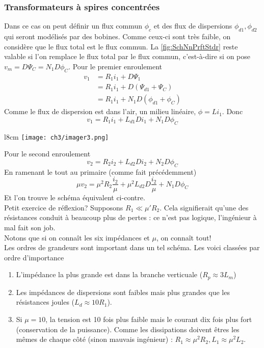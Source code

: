 		\subsubsection{Transformateurs à spires concentrées}
		Dans ce cas on peut définir un flux commun $\phi_c$ et des flux de 
		dispersions $\phi_{d1},\phi_{d2}$ qui seront modélisés par des bobines. 
		Comme ceux-ci sont très faible, on 
		considère que le flux total est le flux commun. La \autoref{fig:SchNnPrftStdr}
		reste valable si l'on remplace le flux total par le flux commun, c'est-à-dire 
		si on pose $v_m = D\Psi_C=N_1D\phi_C$.
		Pour le premier enroulement
		\begin{equation}
		\begin{array}{ll}
		v_1 &= R_1i_1 + D\Psi_1\\
		&= R_1i_1 + D(\Psi_{d1}+\Psi_C)\\
		&= R_1i_1 + N_1D(\phi_{d1}+\phi_C)
		\end{array}
		\end{equation}
		Comme le flux de dispersion est dans l'air, un milieu linéaire, $\phi = Li_1$. 
		Donc
		\begin{equation}
		v_1 = R_1i_1 + L_{d1}Di_1+N_1D\phi_C
		\end{equation}
		\begin{wrapfigure}[13]{l}{8cm}
		\texttt{[image: ch3/imager3.png]}
		\end{wrapfigure}				
		Pour le second enroulement	
		\begin{equation}
		v_2 = R_2i_2 + L_{d2}Di_2+N_2D\phi_C
		\end{equation}	
		En ramenant le tout au primaire (comme fait précédemment)
		\begin{equation}
		\mu v_2 = \mu^2R_2\dfrac{i_2}{\mu}+\mu^2L_{d2}D\dfrac{i_2}{\mu}+N_1D\phi_C
		\end{equation}
		Et l'on trouve le schéma équivalent ci-contre.\\
		
		
		Petit exercice de réflexion? Supposons $R_1\ll \mu'R_2$. Cela signifierait 
		qu'une des résistances conduit à beaucoup plus de pertes : ce n'est pas 
		logique, l'ingénieur à mal fait son job.\\
		Notons que si on connaît les six impédances et $\mu$, on connaît tout!\\
		
		Les ordres de grandeurs sont important dans un tel schéma. Les voici 
		classées par ordre d'importance 
		\begin{enumerate}
		\item L'impédance la plus grande est dans la branche verticuale ($R_p \approx 
		3 L_m$)
		\item Les impédances de dispersions sont faibles mais plus grandes que 
		les résistances joules ($L_d \approx 10 R_1$).
		\item Si $\mu = 10$, la tension est 10 fois plus faible mais le courant 
		dix fois plus fort (conservation de la puissance). Comme les dissipations 
		doivent êtres les mêmes de chaque côté (sinon mauvais ingénieur) : $R_1 
		\approx \mu^2R_2, L_1\approx \mu^2L_2$.
		\end{enumerate}
		
